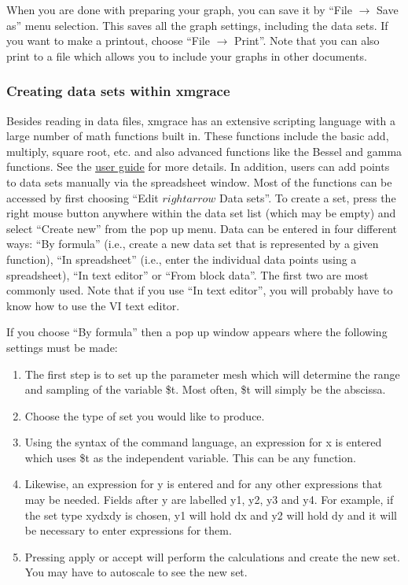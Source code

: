 \documentclass[byrevtex,amssymb,aps,pra,floatfix,letterpaper]{revtex4}
\begin{document}
When you are done with preparing your graph, you can save it by ``File $\rightarrow$ Save as'' menu selection. This saves all the graph settings, including the data sets. If you want to make a printout, choose ``File $\rightarrow$ Print''. Note that you can also print to a file which allows you to include your graphs in other documents.

\subsubsection{Creating data sets within xmgrace}

Besides reading in data files, xmgrace has an extensive scripting language with a large number of math functions built in. These functions include the basic add, multiply, square root, etc. and also advanced functions like the Bessel and gamma functions.  See the \href{http://plasma-gate.weizmann.ac.il/Grace/doc/UsersGuide.html}{\underline{user guide}} for more details. In addition, users can add points to data sets manually via the spreadsheet window. Most of the functions can be accessed by first choosing ``Edit $rightarrow$ Data sets''. To create a set, press the right mouse button anywhere within the data set list (which may be empty) and select ``Create new'' from the pop up menu. Data can be entered in four different ways: ``By formula'' (i.e., create a new data set that is represented by a given function), ``In spreadsheet'' (i.e., enter the individual data points using a spreadsheet), ``In text editor'' or ``From block data''. The first two are most commonly used. Note that if you use ``In text editor'', you will probably have to know how to use the VI text editor.

If you choose ``By formula'' then a pop up window appears where the following settings must be made:

\begin{enumerate}
\item The first step is to set up the parameter mesh which will determine the range and sampling of the variable \$t. Most often, \$t will simply be the abscissa.
\item Choose the type of set you would like to produce.
\item Using the syntax of the command language, an expression for x is entered which uses \$t as the independent variable. This can be any function.
\item Likewise, an expression for y is entered and for any other expressions that may be needed. Fields after y are labelled y1, y2, y3 and y4. For example, if the set type xydxdy is chosen, y1 will hold dx and y2 will hold dy and it will be necessary to enter expressions for them.
\item Pressing apply or accept will perform the calculations and create the new set. You may have to autoscale to see the new set.
\end{enumerate}
\end{document}
